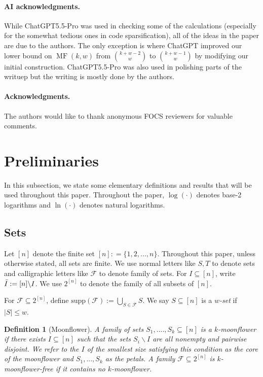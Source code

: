 \documentclass{article}
\newtheorem{definition}[definition]{Definition}
\DeclareMathOperator{\MF}{MF}
\newcommand{\<}{\langle}
\renewcommand{\>}{\rangle}
\newcommand{\calF}{\mathcal{F}}
\newcommand{\supp}{\mathrm{supp}}
\newcommand{\shachar}[1]{\textcolor{blue}{(Shachar: {#1})}}
\begin{document}
\paragraph{AI acknowledgments.} While ChatGPT5.5-Pro was used in checking some of the calculations (especially for the somewhat tedious ones in code sparsification), all of the ideas in the paper are due to the authors. The only exception is  where ChatGPT improved our lower bound on $\MF(k,w)$ from ${k+w-2 \choose w}$ to ${k+w-1 \choose w}$ by modifying our initial construction.
ChatGPT5.5-Pro was also used in polishing parts of the writuep but the writing is mostly done by the authors. 

\paragraph{Acknowledgments. }The authors would like to thank anonymous FOCS reviewers for valuable comments. 


\section{Preliminaries}\label{sec:prelim}

In this subsection, we state some elementary definitions and results that will be used throughout this paper. Throughout the paper, $\log (\cdot)$ denotes base-2 logarithms and $\ln (\cdot)$ denotes natural logarithms.
\subsection{Sets}

Let $[n]$ denote the finite set $[n]: = \{1,2,...,n\}$. Throughout this paper, unless otherwise stated, all sets are finite. We use normal letters like $S,T$ to denote sets and calligraphic letters like $\calF$ to denote family of sets. For $I \subseteq [n]$, write $\Bar{I}:= [n] \backslash I$. We use $2^{[n]}$ to denote the family of all subsets of $[n]$.

For $\calF \subseteq 2^{[n]}$, define $\supp(\calF) := \bigcup_{S \in \calF} S$. We say $S \subseteq [n]$ is a \emph{$w$-set} if $|S| \leq w$.


\begin{definition}[Moonflower]\label{definition:moonflower}
    A family of sets $S_1,....,S_k \subseteq [n]$ is a $k$-moonflower if there exists $I \subseteq [n]$ such that the sets $S_i \backslash I$ are all nonempty and pairwise disjoint. We refer to the $I$ of the smallest size satisfying this condition as the \emph{core} of the moonflower and $S_1,...,S_k$ as the \emph{petals}. A family $\calF \subseteq 2^{[n]}$ is \emph{$k$-moonflower-free} if it contains no $k$-moonflower.
\end{definition}
\end{document}
